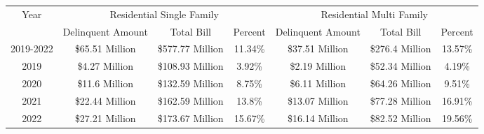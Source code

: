 \begin{tabular}{c|ccc|ccc}
\toprule 
\midrule 
Year & \multicolumn{3}{c}{Residential Single Family} & \multicolumn{3}{c}{Residential Multi Family} \\
 \cmidrule(lr){2-4} \cmidrule(lr){5-7} 
 & Delinquent Amount & Total Bill & Percent & Delinquent Amount & Total Bill & Percent \\
\midrule 
2019-2022 & \$65.51 Million & \$577.77 Million & 11.34\% & \$37.51 Million & \$276.4 Million & 13.57\% \\
2019 & \$4.27 Million & \$108.93 Million & 3.92\% & \$2.19 Million & \$52.34 Million & 4.19\% \\
2020 & \$11.6 Million & \$132.59 Million & 8.75\% & \$6.11 Million & \$64.26 Million & 9.51\% \\
2021 & \$22.44 Million & \$162.59 Million & 13.8\% & \$13.07 Million & \$77.28 Million & 16.91\% \\
2022 & \$27.21 Million & \$173.67 Million & 15.67\% & \$16.14 Million & \$82.52 Million & 19.56\% \\
\midrule 
\bottomrule 
\end{tabular}
